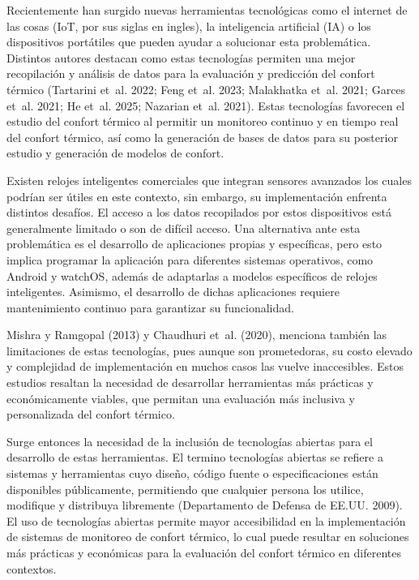 \documentclass[
  12pt,
  letterpaper,
  DIV=11,
  numbers=noendperiod]{scrreport}
\begin{document}
Recientemente han surgido nuevas herramientas tecnológicas como el
internet de las cosas (IoT, por sus siglas en ingles), la inteligencia
artificial (IA) o los dispositivos portátiles que pueden ayudar a
solucionar esta problemática. Distintos autores destacan como estas
tecnologías permiten una mejor recopilación y análisis de datos para la
evaluación y predicción del confort térmico (Tartarini et~al. 2022; Feng
et~al. 2023; Malakhatka et~al. 2021; Garces et~al. 2021; He et~al. 2025;
Nazarian et~al. 2021). Estas tecnologías favorecen el estudio del
confort térmico al permitir un monitoreo continuo y en tiempo real del
confort térmico, así como la generación de bases de datos para su
posterior estudio y generación de modelos de confort.

Existen relojes inteligentes comerciales que integran sensores avanzados
los cuales podrían ser útiles en este contexto, sin embargo, su
implementación enfrenta distintos desafíos. El acceso a los datos
recopilados por estos dispositivos está generalmente limitado o son de
difícil acceso. Una alternativa ante esta problemática es el desarrollo
de aplicaciones propias y específicas, pero esto implica programar la
aplicación para diferentes sistemas operativos, como Android y watchOS,
además de adaptarlas a modelos específicos de relojes inteligentes.
Asimismo, el desarrollo de dichas aplicaciones requiere mantenimiento
continuo para garantizar su funcionalidad.

Mishra y Ramgopal (2013) y Chaudhuri et~al. (2020), menciona también las
limitaciones de estas tecnologías, pues aunque son prometedoras, su
costo elevado y complejidad de implementación en muchos casos las vuelve
inaccesibles. Estos estudios resaltan la necesidad de desarrollar
herramientas más prácticas y económicamente viables, que permitan una
evaluación más inclusiva y personalizada del confort térmico.

Surge entonces la necesidad de la inclusión de tecnologías abiertas para
el desarrollo de estas herramientas. El termino tecnologías abiertas se
refiere a sistemas y herramientas cuyo diseño, código fuente o
especificaciones están disponibles públicamente, permitiendo que
cualquier persona los utilice, modifique y distribuya libremente
(Departamento de Defensa de EE.UU. 2009). El uso de tecnologías abiertas
permite mayor accesibilidad en la implementación de sistemas de
monitoreo de confort térmico, lo cual puede resultar en soluciones más
prácticas y económicas para la evaluación del confort térmico en
diferentes contextos.
\end{document}
